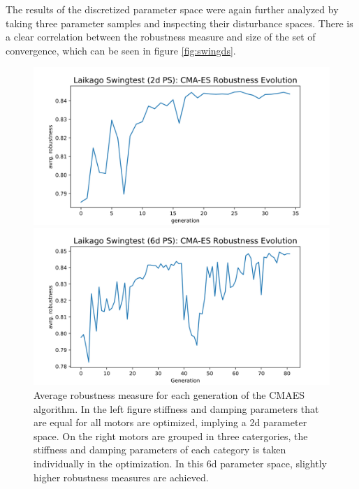     The results of the discretized parameter space were again further analyzed by taking three parameter samples and inspecting their disturbance spaces. There is a clear correlation between the robustness measure and size of the set of convergence, which can be seen in figure \ref{fig:swingds}. 
    \begin{figure}[h]
        \centering
        \begin{minipage}{0.5\textwidth}
            \centering
            \includegraphics[width=\textwidth]{figures/swingtest_2dPS_cmaes.png} %
        \end{minipage}\hfill
        \begin{minipage}{0.5\textwidth}
            \centering
            \includegraphics[width=\textwidth]{figures/swingtest_6d_cmaes.png} %
        \end{minipage}
    \caption[CMAES Evolution for 2d and 6d Parameter Spaces]{Average robustness measure for each generation of the CMAES algorithm. In the left figure stiffness and damping parameters that are equal for all motors are optimized, implying a 2d parameter space. On the right motors are grouped in three catergories, the stiffness and damping parameters of each category is taken individually in the optimization. In this 6d parameter space, slightly higher robustness measures are achieved.}
    \label{fig:cmaes}
    \end{figure}    

